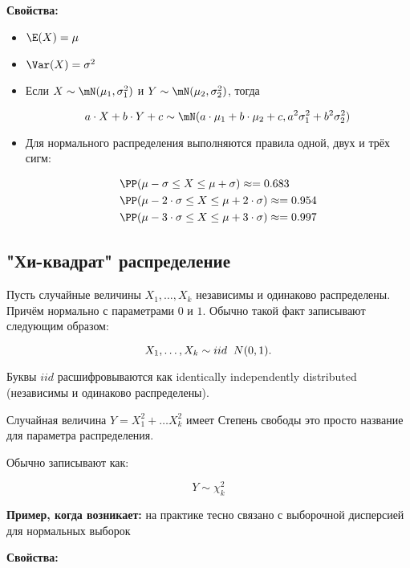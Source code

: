 \textbf{Свойства:}

\begin{itemize} 
\item $\E(X) = \mu$
\item $\Var(X) = \sigma^2$
\item Если $X \sim \mN(\mu_1, \sigma_1^2)$ и $Y \sim \mN(\mu_2, \sigma_2^2)$, тогда 

$$
a\cdot X + b \cdot Y + c \sim \mN(a\cdot \mu_1 + b \cdot \mu_2 + c, a^2 \sigma_1^2 + b^2 \sigma_2^2) 
$$

\item Для нормального распределения выполняются правила одной, двух и трёх сигм: 

\begin{equation*}
\begin{aligned}
& \PP(\mu - \sigma \le X \le \mu + \sigma) \approx = 0.683 \\
& \PP(\mu - 2\cdot \sigma \le X \le \mu + 2 \cdot \sigma) \approx = 0.954 \\
& \PP(\mu - 3 \cdot \sigma \le X \le \mu + 3 \cdot \sigma) \approx = 0.997
\end{aligned}
\end{equation*}
\end{itemize} 


\subsection*{"Хи-квадрат" распределение}

Пусть случайные величины $X_1, \ldots, X_k$ независимы и одинаково распределены. Причём нормально с параметрами $0$ и $1$. Обычно такой факт записывают следующим образом: 

$$
X_1, \ldots, X_k \sim iid \hspace{2mm} N(0,1).
$$ 

Буквы $iid$ расшифровываются как identically independently distributed (независимы и одинаково распределены).

Случайная величина $Y = X_1^2 + \ldots X_k^2$ имеет   Степень свободы это просто название для параметра распределения.

Обычно записывают как:

$$
Y \sim \chi^2_k
$$   

\textbf{Пример, когда возникает:} на практике тесно связано с выборочной дисперсией для нормальных выборок

\textbf{Свойства:}

